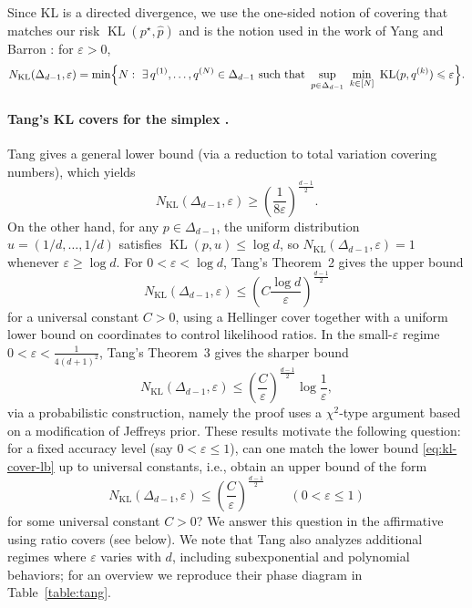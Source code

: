 \documentclass[11pt]{article}
\renewcommand{\le}{\leqslant}
\renewcommand{\ge}{\geqslant}
\newcommand{\eps}{\varepsilon}
\renewcommand{\triangleq}{=}
\newcommand{\kl}{\operatorname{KL}}
\newcommand{\kll}[2]{\kl ({#1}, {#2})}
\theoremstyle{definition}
\theoremstyle{remark}
\begin{document}
Since KL is a directed divergence, we use the one-sided notion of covering that matches our risk $\kl(p^\star,\widehat p)$ and is the notion used in the work of Yang and Barron \cite{yang1999information}: for $\eps>0$,
\[
N_{\kl}(\Delta_{d-1},\eps)
\triangleq
\min\Bigl\{N:\ \exists\,q^{(1)},\dots,q^{(N)}\in\Delta_{d-1}\ \text{such that}\ 
\sup_{p\in\Delta_{d-1}}\ \min_{k\in[N]}\ \kll{p}{q^{(k)}}\le \eps\Bigr\}.
\]

\paragraph{Tang's KL covers for the simplex \cite{tang2022divergence}.}
Tang gives a general lower bound (via a reduction to total variation covering numbers), which yields
\begin{equation}\label{eq:kl-cover-lb}
N_{\kl}(\Delta_{d-1},\eps) \ge \left( \frac{1}{8 \eps}\right)^{\frac{d-1}{2}}.
\end{equation}
On the other hand, for any $p\in\Delta_{d-1}$, the uniform distribution $u=(1/d,\dots,1/d)$ satisfies $\kll{p}{u}\le \log d$, so $N_{\kl}(\Delta_{d-1},\eps)=1$ whenever $\eps\ge \log d$.
For $0<\eps<\log d$, Tang's Theorem~2 gives the upper bound
\[
N_{\kl}(\Delta_{d-1},\eps) \le \left( C \frac{\log d}{\eps} \right)^{\frac{d-1}{2}}
\]
for a universal constant $C>0$, using a Hellinger cover together with a uniform lower bound on coordinates to control likelihood ratios.
In the small-$\eps$ regime $0<\eps<\frac{1}{4(d+1)^2}$, Tang's Theorem~3 gives the sharper bound
\[
N_{\kl}(\Delta_{d-1},\eps) \le \left( \frac{C}{\eps} \right)^{\frac{d-1}{2}} \log \frac{1}{\eps},
\]
via a probabilistic construction, namely the proof uses a $\chi^2$-type argument based on a modification of Jeffreys prior. These results motivate the following question: for a fixed accuracy level (say $0<\eps\le 1$), can one match the lower bound
\eqref{eq:kl-cover-lb} up to universal constants, i.e., obtain an upper bound of the form
\[
N_{\kl}(\Delta_{d-1},\eps) \le \left(\frac{C}{\eps}\right)^{\frac{d-1}{2}}
\qquad (0<\eps\le 1)
\]
for some universal constant $C>0$?
We answer this question in the affirmative using ratio covers (see  below).
We note that Tang also analyzes additional regimes where $\eps$ varies with $d$, including subexponential and polynomial behaviors; for an overview we reproduce their phase diagram in Table~\ref{table:tang}.
\end{document}
